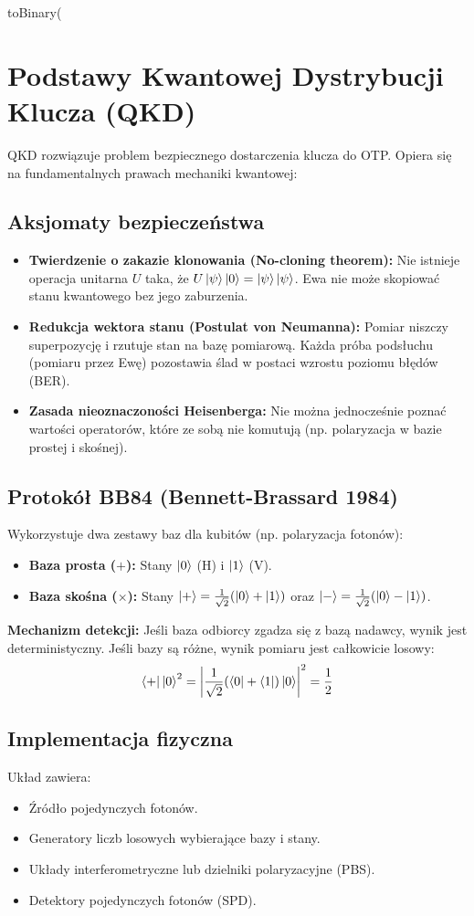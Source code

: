 toBinary(\documentclass{article}
\begin{document}
\section{Podstawy Kwantowej Dystrybucji Klucza (QKD)}

QKD rozwiązuje problem bezpiecznego dostarczenia klucza do OTP. Opiera się na fundamentalnych prawach mechaniki kwantowej:

\subsection{Aksjomaty bezpieczeństwa}
\begin{itemize}
    \item \textbf{Twierdzenie o zakazie klonowania (No-cloning theorem):} Nie istnieje operacja unitarna $U$ taka, że $U\ket{\psi}\ket{0} = \ket{\psi}\ket{\psi}$. Ewa nie może skopiować stanu kwantowego bez jego zaburzenia.
    \item \textbf{Redukcja wektora stanu (Postulat von Neumanna):} Pomiar niszczy superpozycję i rzutuje stan na bazę pomiarową. Każda próba podsłuchu (pomiaru przez Ewę) pozostawia ślad w postaci wzrostu poziomu błędów (BER).
    \item \textbf{Zasada nieoznaczoności Heisenberga:} Nie można jednocześnie poznać wartości operatorów, które ze sobą nie komutują (np. polaryzacja w bazie prostej i skośnej).
\end{itemize}

\subsection{Protokół BB84 (Bennett-Brassard 1984)}
Wykorzystuje dwa zestawy baz dla kubitów (np. polaryzacja fotonów):
\begin{itemize}
    \item \textbf{Baza prosta ($+$):} Stany $\ket{0}$ (H) i $\ket{1}$ (V).
    \item \textbf{Baza skośna ($\times$):} Stany $\ket{+} = \frac{1}{\sqrt{2}}(\ket{0} + \ket{1})$ oraz $\ket{-} = \frac{1}{\sqrt{2}}(\ket{0} - \ket{1})$.
\end{itemize}

\textbf{Mechanizm detekcji:}
Jeśli baza odbiorcy zgadza się z bazą nadawcy, wynik jest deterministyczny. Jeśli bazy są różne, wynik pomiaru jest całkowicie losowy:
$$\bra{+} \ket{0}^2 = \left| \frac{1}{\sqrt{2}} (\bra{0} + \bra{1}) \ket{0} \right|^2 = \frac{1}{2}$$

\subsection{Implementacja fizyczna}
Układ zawiera:
\begin{itemize}
    \item Źródło pojedynczych fotonów.
    \item Generatory liczb losowych wybierające bazy i stany.
    \item Układy interferometryczne lub dzielniki polaryzacyjne (PBS).
    \item Detektory pojedynczych fotonów (SPD).
\end{itemize}
\end{document}
